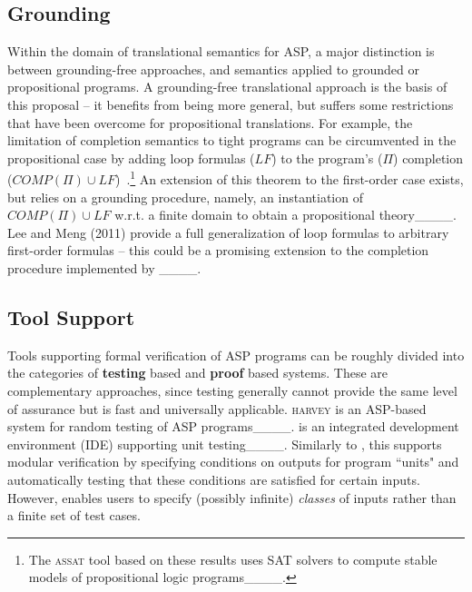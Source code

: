 \subsection{Grounding}
Within the domain of translational semantics for ASP, a major distinction is between grounding-free approaches, and semantics applied to grounded or propositional programs.
%
A grounding-free translational approach is the basis of this proposal -- it benefits from being more general, but suffers some restrictions that have been overcome for propositional translations.
%
For example, the limitation of completion semantics to tight programs can be circumvented in the propositional case by adding loop formulas ($LF$) to the program's ($\Pi$) completion ($COMP(\Pi) \cup LF$)~\cite[Theorem 1]{linzhao04}.\footnote{The \textsc{assat} tool based on these results uses SAT solvers to compute stable models of propositional logic programs____.}
%
An extension of this theorem to the first-order case exists, but relies on a grounding procedure, namely, an instantiation of $COMP(\Pi) \cup LF$ w.r.t. a finite domain to obtain a propositional theory____.
%
Lee and Meng (2011) provide a full generalization of loop formulas to arbitrary first-order formulas -- this could be a promising extension to the completion procedure implemented by \anthem____.


\subsection{Tool Support}
Tools supporting formal verification of ASP programs can be roughly divided into the categories of \textbf{testing} based and \textbf{proof} based systems.
These are complementary approaches, since testing generally cannot provide the same level of assurance but is fast and universally applicable.
\textsc{harvey} is an ASP-based system for random testing of ASP programs____.
\aspide is an integrated development environment (IDE) supporting unit testing____.
Similarly to \anthem, this supports modular verification by specifying conditions on outputs for program ``units" and automatically testing that these conditions are satisfied for certain inputs.
However, \anthem enables users to specify (possibly infinite) \emph{classes} of inputs rather than a finite set of test cases.




